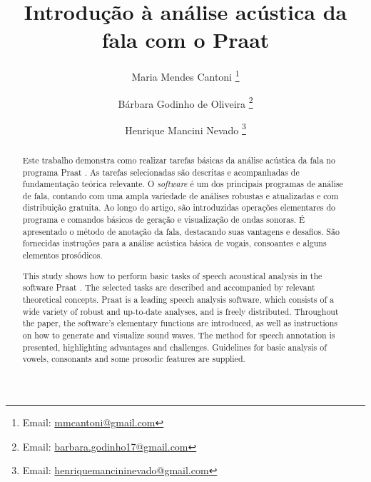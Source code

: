 \documentclass[portuguese]{textolivre}
\title{Introdução à análise acústica da fala com o Praat}
\author[1]{Maria Mendes Cantoni \orcid{0000-0001-9515-1802} \thanks{Email: \url{mmcantoni@gmail.com}}}
\author[1]{Bárbara Godinho de Oliveira \orcid{0000-0002-0962-1212} \thanks{Email: \url{barbara.godinho17@gmail.com}}}
\author[1]{Henrique Mancini Nevado \orcid{0000-0001-7482-9530} \thanks{Email: \url{henriquemancininevado@gmail.com}}}
\affil[1]{Universidade Federal de Minas Gerais, Faculdade de Letras, Belo Horizonte, MG, Brasil.}
\begin{document}
\maketitle

\begin{polyabstract}
\begin{abstract}
Este trabalho demonstra como realizar tarefas básicas da análise acústica da fala no programa Praat \cite{boersma_2022}. As tarefas selecionadas são descritas e acompanhadas de fundamentação teórica relevante. O \textit{software} é um dos principais programas de análise de fala, contando com uma ampla variedade de análises robustas e atualizadas e com distribuição gratuita. Ao longo do artigo, são introduzidas operações elementares do programa e comandos básicos de geração e visualização de ondas sonoras. É apresentado o método de anotação da fala, destacando suas vantagens e desafios. São fornecidas instruções para a análise acústica básica de vogais, consoantes e alguns elementos prosódicos.

\end{abstract}

\begin{english}
\begin{abstract}
This study shows how to perform basic tasks of speech acoustical analysis in the software Praat \cite{boersma_2022}. The selected tasks are described and accompanied by relevant theoretical concepts. Praat is a leading speech analysis software, which consists of a wide variety of robust and up-to-date analyses, and is freely distributed. Throughout the paper, the software’s elementary functions are introduced, as well as instructions on how to generate and visualize sound waves. The method for speech annotation is presented, highlighting advantages and challenges. Guidelines for basic analysis of vowels, consonants and some prosodic features are supplied.

\end{abstract}
\end{english}

\end{polyabstract}
\end{document}
